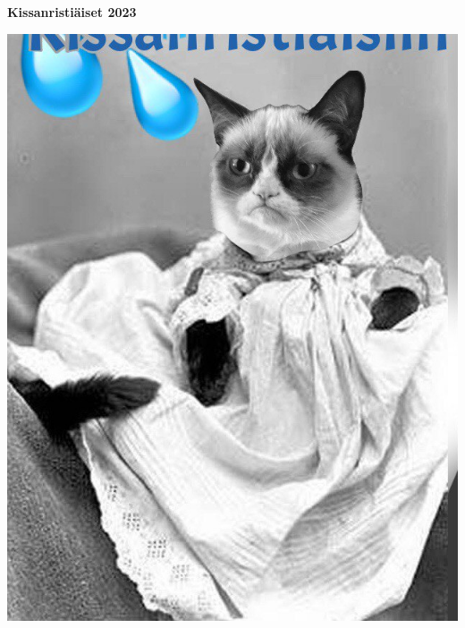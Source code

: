 \documentclass[10pt]{article}
\begin{document}
\begin{center}

\vspace*{3cm}
\textbf{\sc\Huge Kissanristiäiset 2023}
\vspace{0.2cm}

\hspace*{-0.5cm}
\includegraphics[scale=0.45]{kuvat/kissanristiaiset.png}

\vspace{0.2cm}
\sc\Large

\vspace{2.5cm}
\end{center}

\pagebreak
{}



\begin{flushleft}

\end{flushleft}
\end{document}
